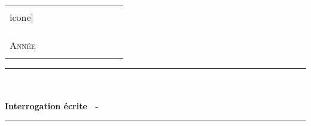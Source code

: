 %
%



  \begin{center} %


	
	\begin{center}
		\begin{tabular}{p{0.3\linewidth}p{0.6\linewidth}}
			\begin{minipage}{\linewidth}
				\begin{center}
					\texttt{[image: \\icone]}\\[0.5cm]
				\end{center}
			\end{minipage}
			&
			\begin{minipage}{\linewidth}
				\textsc{\Large \etablissement}\\[0.3cm]
				\textsc{\large \discipline}\\[0.3cm]
					\textsc{\large \classe}\\[0.3cm]
					\textsc{\large Année \annee}\\
			\end{minipage}
			\end{tabular}
	\end{center}
	\vspace{0.6cm}

    
    \rule{\linewidth}{0.5mm}\\[0.4cm]

    {\textsc{\cycle}}\\[0.4cm]

    { \huge \bfseries Interrogation écrite \numero\ - \titre }\\[0.4cm]

    \rule{\linewidth}{0.5mm}\\[1cm]


  \end{center}	%



